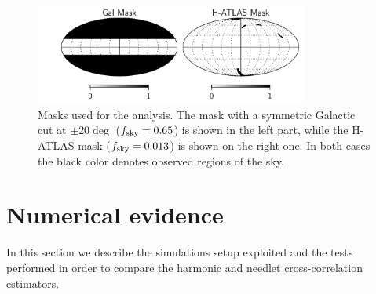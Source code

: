 \begin{figure}[tbp]
\centering %
\includegraphics[width=0.8\textwidth]{Chapter5/Images/masks.pdf}
\caption{\label{fig:masks} Masks used for the analysis. The mask with a symmetric Galactic cut at $\pm 20\deg$ ($f_{\rm{sky}}= 0.65$) is shown
in the left part, while the H-ATLAS mask ($f_{\rm{sky}} = 0.013$) is shown on the right one. In both cases the black color denotes
observed regions of the sky.}
\end{figure}
%

\section{Numerical evidence}
\label{sec:num_ev}
In this section we describe the simulations setup exploited and the tests performed in order to compare the harmonic and needlet cross-correlation estimators.

